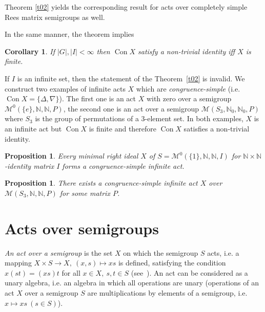 \documentclass{birkau}
\numberwithin{equation}{section}
\theoremstyle{plain}
\newtheorem{proposition}[theorem]{Proposition}
\newtheorem{corollary}[theorem]{Corollary}
\theoremstyle{definition}
\DeclareMathOperator{\Con}{Con}
\begin{document}
	Theorem \ref{t02} yields the corresponding result for acts over completely simple Rees matrix semigroups as well.
	
	In the same manner, the theorem implies
	
	\begin{corollary}
	    If $|G|,|I| < \infty$ then $\Con X$ satisfy a non-trivial identity iff $X$ is finite.
	\end{corollary}
	
	If $I$ is an infinite set, then the statement of the Theorem~\ref{t02} is invalid. We construct two examples of infinite acts $X$ which are \textit{congruence-simple} (i.e. $\Con X = \{ \Delta, \nabla \}$). The first one is an act $X$ with zero over a semigroup $\mathcal{M}^0(\{e\},\mathbb{N},\mathbb{N},P)$, the second one is an act over a semigroup $\mathcal{M}(S_3,\mathbb{N}_0,\mathbb{N}_0,P)$ where $S_3$ is the group of permutations of a 3-element set. In both examples, $X$ is an infinite act but $\Con X$ is finite and therefore $\Con X$ satisfies a non-trivial identity.
	
	\begin{proposition} \label{pr01a}
    	Every minimal right ideal $X$ of $S = \mathcal{M}^0(\{1\},\mathbb{N},\mathbb{N},I) $ for $\mathbb{N} \times \mathbb{N}$-identity matrix $I$ forms a congruence-simple infinite act.
    	
	\end{proposition}
	
	\begin{proposition} \label{pr2.1}
	    There exists a congruence-simple infinite act $X$ over \newline $\mathcal{M}(S_3,\mathbb{N},\mathbb{N},P) $ for some matrix $P$.
	\end{proposition}

\section{Acts over semigroups}	

	\textit{An act over a semigroup} is the set $X$ on which the semigroup $S$ acts, i.e. a mapping $ X \times S \rightarrow X,\ (x,s) \mapsto xs $ is defined, satisfying the condition $ x(st)=(xs)t $ for all $x\in X,\ s,t\in S$ (see~\cite{kilp}). An act can be considered as a unary algebra, i.e. an algebra in which all operations are unary (operations of an act $X$ over a semigroup $S$ are multiplications by elements of a semigroup, i.e. $ x \mapsto xs \ (s\in S) $).
	
\end{document}

